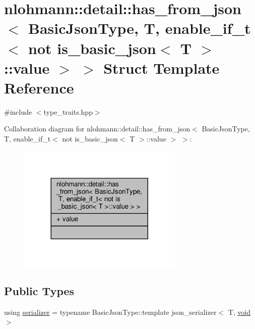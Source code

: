 \hypertarget{structnlohmann_1_1detail_1_1has__from__json_3_01_basic_json_type_00_01_t_00_01enable__if__t_3_01e29213c543deddccc314d19cbaf9f3b4}{}\section{nlohmann\+:\+:detail\+:\+:has\+\_\+from\+\_\+json$<$ Basic\+Json\+Type, T, enable\+\_\+if\+\_\+t$<$ not is\+\_\+basic\+\_\+json$<$ T $>$\+:\+:value $>$ $>$ Struct Template Reference}
\label{structnlohmann_1_1detail_1_1has__from__json_3_01_basic_json_type_00_01_t_00_01enable__if__t_3_01e29213c543deddccc314d19cbaf9f3b4}


{\ttfamily \#include $<$type\+\_\+traits.\+hpp$>$}



Collaboration diagram for nlohmann\+:\+:detail\+:\+:has\+\_\+from\+\_\+json$<$ Basic\+Json\+Type, T, enable\+\_\+if\+\_\+t$<$ not is\+\_\+basic\+\_\+json$<$ T $>$\+:\+:value $>$ $>$\+:\nopagebreak
\begin{figure}[H]
\begin{center}
\leavevmode
\includegraphics[width=224pt]{structnlohmann_1_1detail_1_1has__from__json_3_01_basic_json_type_00_01_t_00_01enable__if__t_3_01eb9878f189208cd1791d5e946e18edef}
\end{center}
\end{figure}
\subsection*{Public Types}
\begin{DoxyCompactItemize}
\item 
using \hyperlink{structnlohmann_1_1detail_1_1has__from__json_3_01_basic_json_type_00_01_t_00_01enable__if__t_3_01e29213c543deddccc314d19cbaf9f3b4_ab17cea1be422b8985fc19942809560ed}{serializer} = typename Basic\+Json\+Type\+::template json\+\_\+serializer$<$ T, \hyperlink{namespacenlohmann_1_1detail_a59fca69799f6b9e366710cb9043aa77d}{void} $>$
\end{DoxyCompactItemize}
